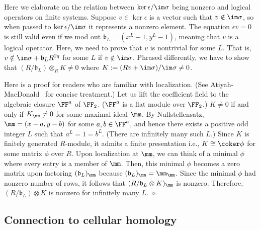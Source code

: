 \begin{rem}\label{NonvanishingModule}
Here we elaborate on the relation between $\ker \epsilon / \im \sigma$ being nonzero
and logical operators on finite systems.
Suppose $v \in \ker \epsilon$ is a vector such that $v \notin \im \sigma$,
so when passed to $\ker \epsilon / \im \sigma$ it represents a nonzero element.
The equation $\epsilon v = 0$ is still valid 
even if we mod out $\mathfrak b_L = (x^L-1,y^L-1)$,
meaning that $v$ is a logical operator.
Here, we need to prove that $v$ is nontrivial for some $L$.
That is, $v \notin \im \sigma + \mathfrak b_L R^{2q}$ for some $L$
if $v \notin \im \sigma$.
Phrased differently, we have to show that 
$(R/\mathfrak b_L) \otimes_R K \neq 0$
where $K := (Rv + \im \sigma) / \im \sigma \neq 0$.

Here is a proof for readers who are familiar with localization.
(See Atiyah-MacDonald~\cite{AtiyahMacDonald} for concise treatment.)
Let us lift the coefficient field to the algebraic closure $\FF^a$ of $\FF_2$.
($\FF^a$ is a flat module over $\FF_2$.)
$K \neq 0$ if and only if $K_{\mm} \neq 0$ for some maximal ideal $\mm$.
By Nullstellensatz, $\mm = (x - a, y - b)$ for some $a,b \in \FF^a$,
and hence there exists a positive odd integer $L$ such that $a^L = 1 = b^L$.
(There are infinitely many such $L$.)
Since $K$ is finitely generated $R$-module, it admits a finite presentation
i.e., $K \cong \coker \phi$ for some matrix $\phi$ over $R$.
Upon localization at $\mm$,
we can think of a minimal $\phi$ where every entry is a member of $\mm$.
Then, this minimal $\phi$ becomes a zero matrix
upon factoring $(\mathfrak b_L)_{\mm}$
because $(\mathfrak b_L)_{\mm} = \mm _{\mm}$.
Since the minimal $\phi$ had nonzero number of rows,
it follows that $(R/\mathfrak b_L \otimes K)_{\mm}$ is nonzero.
Therefore, $(R/\mathfrak b_L) \otimes K$ is nonzero
for infinitely many $L$.
\hfill $\diamond$ \end{rem}


\subsection{Connection to cellular homology}

